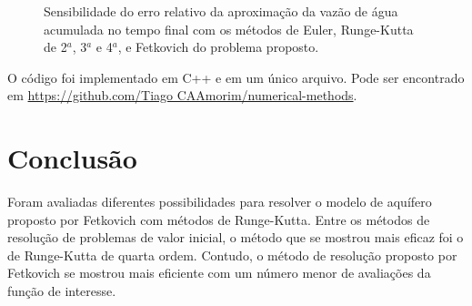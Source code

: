 \documentclass[final,5p]{elsarticle}
\numberwithin{equation}{section}
\begin{document}
        \begin{figure}[hbt!]
            \caption{Sensibilidade do erro relativo da aproximação da vazão de água acumulada no tempo final com os métodos de Euler, Runge-Kutta de 2$^a$, 3$^a$ e 4$^a$, e Fetkovich do problema proposto.}
            \label{fig:testeaq1sensrk}
        \end{figure}

        O código foi implementado em C++ e em um único arquivo. Pode ser encontrado em \href{https://github.com/TiagoCAAmorim/numerical-methods/blob/main/07_RungeKutta/07_RungeKutta.cpp}{https://github.com/Tiago CAAmorim/numerical-methods}.

    \section{Conclusão}

        Foram avaliadas diferentes possibilidades para resolver o modelo de aquífero proposto por Fetkovich com métodos de Runge-Kutta. Entre os métodos de resolução de problemas de valor inicial, o método que se mostrou mais eficaz foi o de Runge-Kutta de quarta ordem. Contudo, o método de resolução proposto por Fetkovich se mostrou mais eficiente com um número menor de avaliações da função de interesse.
\end{document}
